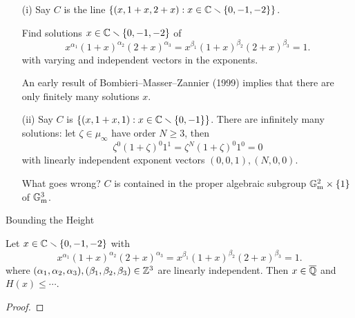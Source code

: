\documentclass{beamer}
\begin{document}
\begin{frame}
  \begin{example}
    \begin{enumerate}
    \item [(i)]
      Say $C$ is the line $\left\{(x,1+x,2+x) : x\in {\mathbb{C}}\smallsetminus\{0,-1,-2\}\right\}$.
      
      Find solutions  $x\in{\mathbb{C}}\smallsetminus\{0,-1,-2\}$ of 
      \begin{equation*}
        x^{\alpha_1} (1+x)^{\alpha_2} (2+x)^{\alpha_3} =
        x^{\beta_1} (1+x)^{\beta_2} (2+x)^{\beta_3} = 1.
      \end{equation*}
      with \alert{varying} and \alert{independent}  vectors in the
      exponents.

      An early result of Bombieri--Masser--Zannier (1999) implies
      that there are only \alert{finitely} many solutions $x$.

    \item[(ii)] Say $C$ is $\{(x,1+x,1) : x\in {\mathbb{C}}\smallsetminus \{0,-1\}\}$.
      There are \alert{infinitely} many solutions:  let
      $\zeta\in\mu_\infty$ have order $N\ge 3$, then 
      \begin{equation*}
        \zeta^{0} (1+\zeta)^{0} 1^{1} = \zeta^{N} (1+\zeta)^{0} 1^0 = 0
      \end{equation*}
      with linearly independent exponent vectors $(0,0,1),(N,0,0)$.

      What goes wrong? $C$ is contained in the proper algebraic subgroup
      ${\mathbb{G}}_{\mathrm{m}}^2\times \{1\}$ of ${\mathbb{G}}_{\mathrm{m}}^3$. 
    \end{enumerate}
  \end{example}  
\end{frame}

\begin{frame}{Bounding the Height}
  \begin{lemma}
    Let 
    $x\in{\mathbb{C}}\smallsetminus\{0,-1,-2\}$ with
    \begin{equation*}
      x^{\alpha_1} (1+x)^{\alpha_2} (2+x)^{\alpha_3} =
      x^{\beta_1} (1+x)^{\beta_2} (2+x)^{\beta_3} = 1.
    \end{equation*}
    where
    $(\alpha_1,\alpha_2,\alpha_3),(\beta_1,\beta_2,\beta_3)\in{\mathbb{Z}}^3$
    are linearly independent. Then $x\in{\overline{\mathbb{Q}}}$ and $H(x)\le \cdots$. 
  \end{lemma}
  \begin{proof}\renewcommand{\qedsymbol}{}
    \vspace{2cm}
  \end{proof}  
\end{frame}
\end{document}

